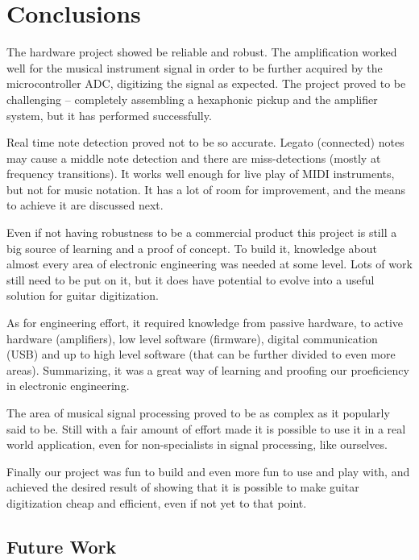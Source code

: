 \chapter[Conclusion]{Conclusions}

The hardware project showed be reliable and robust. The amplification worked
well for the musical instrument signal in order to be further acquired by the
microcontroller ADC, digitizing the signal as expected.
The project proved to be challenging -- completely assembling a
hexaphonic pickup and the amplifier system, but it has performed successfully.

Real time note detection proved not to be so accurate. Legato (connected) notes
may cause a middle note detection and there are miss-detections (mostly at frequency
transitions). It works well enough for live play of MIDI instruments, but not
for music notation. It has a lot of room for improvement, and the means to achieve
it are discussed next.

Even if not having robustness to be a commercial product this project is still a big source
of learning and a proof of concept. To build it, knowledge about almost every area
of electronic engineering was needed at some level. Lots of work still need to be put on it,
but it does have potential to evolve into a useful solution for guitar digitization.

As for engineering effort, it required knowledge from passive hardware, to active hardware
(amplifiers), low level software (firmware), digital communication (USB) and up to high
level software (that can be further divided to even more areas). Summarizing, it was
a great way of learning and proofing our proeficiency in electronic engineering.

The area of musical signal processing proved to be as complex as it popularly said to be.
Still with a fair amount of effort made it is possible to use it in a real world application,
even for non-specialists in signal processing, like ourselves.

Finally our project was fun to build and even more fun to use and play with, and achieved
the desired result of showing that it is possible to make guitar digitization cheap and
efficient, even if not yet to that point.

\section{Future Work}

